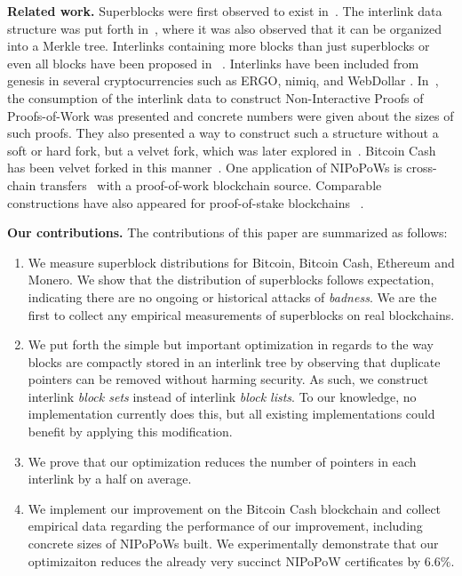 \noindent
\textbf{Related work.}
Superblocks were first observed to exist in~\cite{highway}.
The interlink data structure was put forth in~\cite{popow}, where it was also
observed that it can be organized into a Merkle tree. Interlinks containing more
blocks than just superblocks or even all blocks have been
proposed in~\cite{vitalik-eip,flyclient} . Interlinks have
been included from genesis in several cryptocurrencies such as ERGO, nimiq, and
WebDollar . In~\cite{nipopows}, the consumption of the
interlink data to construct Non-Interactive Proofs of Proofs-of-Work was
presented and concrete numbers were given about the sizes of such proofs. They
also presented a way to construct such a structure without a soft or hard fork,
but a velvet fork, which was later explored in~\cite{velvet}. Bitcoin Cash has
been velvet forked in this manner~\cite{gtklocker}. One
application of NIPoPoWs is cross-chain transfers~\cite{pow-sidechains}
 with a proof-of-work blockchain source. Comparable
constructions have also appeared for proof-of-stake
blockchains~\cite{pos-sidechains} .

\noindent
\textbf{Our contributions.} The contributions of this paper are summarized as
follows:

\begin{enumerate}
  \item We measure superblock distributions for Bitcoin, Bitcoin Cash, Ethereum
        and Monero. We show that the distribution of superblocks follows
        expectation, indicating there are no ongoing or historical attacks of
        \emph{badness}. We are the first to collect any empirical measurements
        of superblocks on real blockchains.
  \item We put forth the simple but important optimization in regards to the way
        blocks are compactly stored in an interlink tree by observing that
        duplicate pointers can be removed without harming security. As such, we
        construct interlink \emph{block sets} instead of interlink \emph{block
        lists}. To our knowledge, no implementation currently does this, but all
        existing implementations could benefit by applying this modification.
  \item We prove that our optimization reduces the number of pointers in each
        interlink by a half on average.
  \item We implement our improvement on the Bitcoin Cash blockchain and collect
        empirical data regarding the performance of our improvement, including
        concrete sizes of NIPoPoWs built. We experimentally demonstrate that our
        optimizaiton reduces the already very succinct NIPoPoW certificates by
        $6.6\%$.
\end{enumerate}
